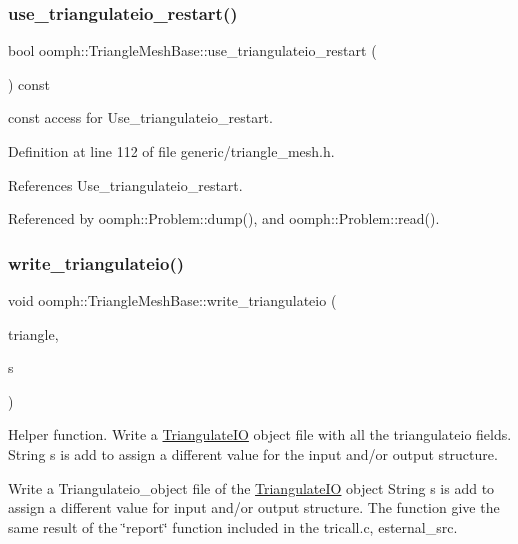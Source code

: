 \subsubsection{\texorpdfstring{use\+\_\+triangulateio\+\_\+restart()}{use\_triangulateio\_restart()}}
{\footnotesize\ttfamily bool oomph\+::\+Triangle\+Mesh\+Base\+::use\+\_\+triangulateio\+\_\+restart (\begin{DoxyParamCaption}{ }\end{DoxyParamCaption}) const\hspace{0.3cm}{\ttfamily [inline]}}



const access for Use\+\_\+triangulateio\+\_\+restart. 



Definition at line 112 of file generic/triangle\+\_\+mesh.\+h.



References Use\+\_\+triangulateio\+\_\+restart.



Referenced by oomph\+::\+Problem\+::dump(), and oomph\+::\+Problem\+::read().

\mbox{\label{classoomph_1_1TriangleMeshBase_ac6bf9ce6546b2e853c3c84cd44837c31}} 
\subsubsection{\texorpdfstring{write\+\_\+triangulateio()}{write\_triangulateio()}}
{\footnotesize\ttfamily void oomph\+::\+Triangle\+Mesh\+Base\+::write\+\_\+triangulateio (\begin{DoxyParamCaption}\item[{\hyperlink{structoomph_1_1TriangulateIO}{Triangulate\+IO} \&}]{triangle,  }\item[{std\+::string \&}]{s }\end{DoxyParamCaption})}



Helper function. Write a \hyperlink{structoomph_1_1TriangulateIO}{Triangulate\+IO} object file with all the triangulateio fields. String s is add to assign a different value for the input and/or output structure. 

Write a Triangulateio\+\_\+object file of the \hyperlink{structoomph_1_1TriangulateIO}{Triangulate\+IO} object String s is add to assign a different value for input and/or output structure. The function give the same result of the \char`\"{}report\char`\"{} function included in the tricall.\+c, esternal\+\_\+src. 

